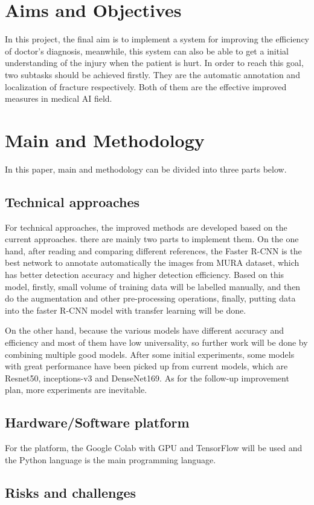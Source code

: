 \documentclass[12pt,oneside,a4paper]{article}
\begin{document}
\section{Aims and Objectives}
In this project, the final aim is to implement a system for improving the efficiency of doctor’s diagnosis, meanwhile, this system can also be able to get a initial understanding of the injury when the patient is hurt. In order to reach this goal, two subtasks should be achieved firstly. They are the automatic annotation and localization of fracture respectively. Both of them are the effective improved measures in medical AI field.
\section{Main and Methodology}
In this paper, main and methodology can be divided into three parts below.
\subsection{Technical approaches}
For technical approaches, the improved methods are developed based on the current approaches. there are mainly two parts to implement them. On the one hand, after reading and comparing different references, the Faster R-CNN is the best network to annotate automatically the images from MURA dataset, which has better
detection accuracy and higher detection efficiency. Based on this model, firstly, small volume of training data will be labelled manually, and then do the augmentation and other pre-processing operations, finally, putting data into the faster R-CNN model with transfer learning will be done.

On the other hand, because the various models have different accuracy and efficiency and most of them have low universality, so further work will be done by combining multiple good models. After some initial experiments, some models with great performance have been picked up from current models, which are Resnet50, inceptions-v3 and DenseNet169. As for the follow-up improvement plan, more experiments are inevitable. 

\subsection{Hardware/Software platform}
For the platform, the Google Colab with GPU and TensorFlow will be used and the Python language is the main programming language. 
\subsection{Risks and challenges}
\end{document}
